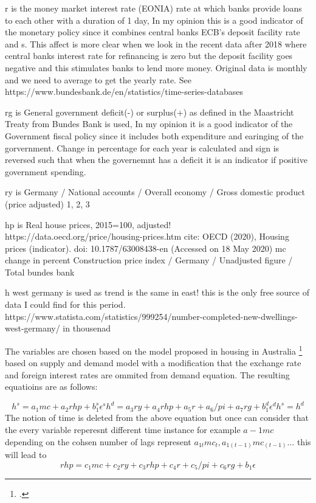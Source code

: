 r is the money market interest rate (EONIA) rate at which banks provide loans to each other with a duration of 1 day, In my opinion this is a good indicator of the monetary policy since it combines central banks ECB's deposit facility rate and  s. This affect is more clear when we look in the recent data after 2018 where central banks interest rate for refinancing is zero but the deposit facility goes negative and this stimulates banks to lend more money. Original data is monthly and we need to average to get the yearly rate. See https://www.bundesbank.de/en/statistics/time-series-databases

rg is
General government deficit(-) or surplus(+) as defined in the Maastricht Treaty from  Bundes Bank is used, In my opinion it is a good indicator of the Government fiscal policy since it includes both expenditure and earinging of the gorvernment. Change in percentage for each year is calculated and sign is reversed such that when the governemnt has a deficit it is an indicator if positive government spending.

ry is
Germany / National accounts / Overall economy / Gross domestic product (price adjusted) 1, 2, 3

hp is 
Real house prices, 2015=100, adjusted! https://data.oecd.org/price/housing-prices.htm
cite: OECD (2020), Housing prices (indicator). doi: 10.1787/63008438-en (Accessed on 18 May 2020)
mc 
change in percent Construction price index / Germany / Unadjusted figure / Total  bundes bank

h
west germany is used as trend is the same in east! this is the only free source of data I could find for this period.
 https://www.statista.com/statistics/999254/number-completed-new-dwellings-west-germany/ in thousenad

The variables are chosen based on the model proposed in housing in Australia \footcite[See.][]{Wadud2009} based on supply and demand model with a modification that the exchange rate and foreign interest rates are ommited from demand equation. The resulting equatioins are as follows:

\[ 
h^s = a_1 mc + a_2 rhp + b_1^s \epsilon^s
h^d = a_3 ry + a_4 rhp + a_5 r + a_6 /pi + a_7 rg  + b_1^d \epsilon^d
h^s = h^d
\]
The notion of time is deleted from the above equation but once can consider that the every variable reperesnt different time instance for example $a-1 mc$ depending on the cohsen number of lags represent $a_{1t} mc_{t} ,  a_{1(t-1)} mc_{(t-1)} ...  $
this will lead to 
\[
 rhp  = c_1 mc+  c_2 ry + c_3 rhp  + c_4 r + c_5 /pi + c_6 rg  + b_1 \epsilon
\]

